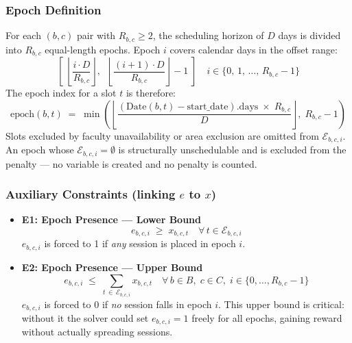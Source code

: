 \documentclass{article}
\begin{document}
\subsubsection*{Epoch Definition}
For each $(b, c)$ pair with $R_{b,c} \geq 2$, the scheduling horizon of $D$ days is
divided into $R_{b,c}$ equal-length epochs. Epoch $i$ covers calendar days in the
offset range:
\begin{equation}
    \left[\;\left\lfloor \frac{i \cdot D}{R_{b,c}} \right\rfloor,\;\;
           \left\lfloor \frac{(i+1) \cdot D}{R_{b,c}} \right\rfloor - 1\;\right]
    \quad i \in \{0,\,1,\,\ldots,\,R_{b,c}-1\}
\end{equation}
The epoch index for a slot $t$ is therefore:
\begin{equation}
    \mathrm{epoch}(b,t) \;=\;
    \min\!\left(
        \left\lfloor
            \frac{(\mathrm{Date}(b,t) - \mathrm{start\_date}).\mathrm{days}
                  \;\times\; R_{b,c}}{D}
        \right\rfloor,\;
        R_{b,c} - 1
    \right)
\end{equation}
Slots excluded by faculty unavailability or area exclusion are omitted from
$\mathcal{E}_{b,c,i}$. An epoch whose $\mathcal{E}_{b,c,i} = \emptyset$ is
structurally unschedulable and is excluded from the penalty — no variable is created
and no penalty is counted.

\subsubsection*{Auxiliary Constraints (linking $e$ to $x$)}
\begin{itemize}
    \item \textbf{E1: Epoch Presence — Lower Bound}
    \begin{equation}
        e_{b,c,i} \;\geq\; x_{b,c,t}
        \quad \forall\, t \in \mathcal{E}_{b,c,i}
    \end{equation}
    $e_{b,c,i}$ is forced to 1 if \emph{any} session is placed in epoch $i$.

    \item \textbf{E2: Epoch Presence — Upper Bound}
    \begin{equation}
        e_{b,c,i} \;\leq\; \sum_{t\,\in\,\mathcal{E}_{b,c,i}} x_{b,c,t}
        \quad \forall\, b \in B,\; c \in C,\; i \in \{0,\ldots,R_{b,c}-1\}
    \end{equation}
    $e_{b,c,i}$ is forced to 0 if \emph{no} session falls in epoch $i$.
    This upper bound is critical: without it the solver could set $e_{b,c,i} = 1$
    freely for all epochs, gaining reward without actually spreading sessions.
\end{itemize}
\end{document}
